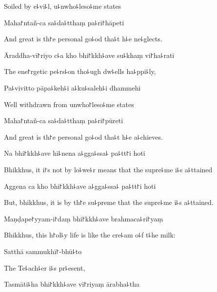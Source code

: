 \begin{english}
  Soiled by e꜕vi꜕l, u꜕nwho꜕leso꜕me states
\end{english}

Maha꜓ntañ-ca sa꜕da꜕tthaṃ pa꜕ri꜓hāpeti

\begin{english}
  And great is th꜓e personal go꜕od tha꜕t h꜕e ne꜕glects.
\end{english}

Āraddha-vī꜓riyo c꜕a kho bhi꜓kkh꜕ave su꜕khaṃ vi꜓ha꜕rati

\begin{english}
  The ene꜓rgetic pe꜕rs꜕on tho꜕ugh dw꜕ells ha꜕ppi꜕ly,
\end{english}

Pa꜕vivitto pāpa꜕keh꜕i a꜕ku꜕saleh꜕i dhammehi

\begin{english}
  Well withdrawn from unwho꜓leso꜕me states
\end{english}

Maha꜓ntañ-ca sa꜕da꜕tthaṃ pa꜕ri꜓pūreti

\begin{english}
  And great is th꜓e personal go꜕od tha꜕t h꜕e a꜕chieves.
\end{english}

Na bhi꜓kkh꜕ave hī꜕nena a꜕gga꜕ssa꜕ pa꜕tt꜓i hoti

\begin{english}
  Bhikkhus, it i꜓s not by lo꜕we꜕r means that the supre꜕me i꜕s a꜕ttained
\end{english}

Aggena ca kho bhi꜓kkh꜕ave a꜕gga꜕ssa꜕ pa꜕tt꜓i hoti

\begin{english}
  But, bhikkhus, it is by th꜓e su꜕preme that the supre꜕me i꜕s a꜕ttained.
\end{english}

Maṇḍape꜓yyam-i꜓daṃ bhi꜓kkh꜕ave brahmaca꜕ri꜓yaṃ

\begin{english}
  Bhikkhus, this h꜓ol꜕y life is like the cre꜕am o꜕f t꜕he milk:
\end{english}

Satthā sammukhī꜓-bhū꜕to

\begin{english}
  The Te꜕ach꜕er i꜕s pr꜕esent,
\end{english}

Tasmāti꜕ha bhi꜓kkh꜕ave vī꜓riyaṃ ārabha꜕tha

